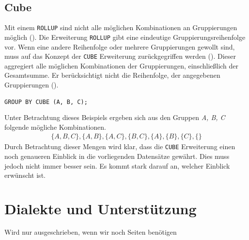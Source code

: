 \subsection{Cube}
Mit einem \texttt{ROLLUP} sind nicht alle möglichen Kombinationen an Gruppierungen
möglich (\cite{oracle16}). Die Erweiterung \texttt{ROLLUP} gibt eine eindeutige Gruppierungsreihenfolge
vor. Wenn eine andere Reihenfolge oder mehrere Gruppierungen gewollt sind, muss auf
das Konzept der \texttt{CUBE} Erweiterung zurückgegriffen werden (\cite{oracle16}).
Dieser aggregiert alle möglichen Kombinationen der Gruppierungen, einschließlich
der Gesamtsumme. Er berücksichtigt nicht die Reihenfolge, der angegebenen
Gruppierungen (\cite{oracle16}).

\texttt{GROUP BY CUBE (A, B, C);}

Unter Betrachtung dieses Beispiels ergeben sich aus den Gruppen \textit{A, B, C}
folgende mögliche Kombinationen.
\begin{align*}
	\{ A, B, C\}, \{A, B\}, \{A, C\}, \{B, C\}, \{A\}, \{B\}, \{C\}, \{ \}
\end{align*}
Durch Betrachtung dieser Mengen wird klar, dass die \texttt{CUBE} Erweiterung
einen noch genaueren Einblick in die vorliegenden Datensätze gewährt. Dies muss jedoch
nicht immer besser sein. Es kommt stark darauf an, welcher Einblick erwünscht ist.


\section{Dialekte und Unterstützung}
Wird nur ausgeschrieben, wenn wir noch Seiten benötigen